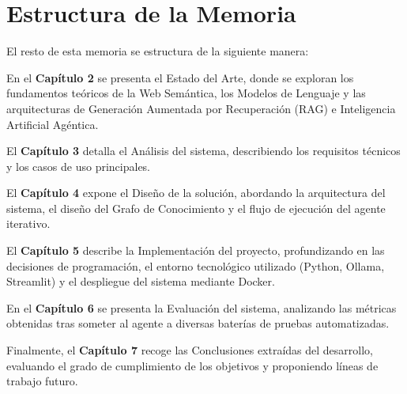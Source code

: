 \section{Estructura de la Memoria}

El resto de esta memoria se estructura de la siguiente manera:

En el \textbf{Capítulo 2} se presenta el Estado del Arte, donde se exploran los fundamentos teóricos de la Web Semántica, los Modelos de Lenguaje y las arquitecturas de Generación Aumentada por Recuperación (RAG) e Inteligencia Artificial Agéntica. 

El \textbf{Capítulo 3} detalla el Análisis del sistema, describiendo los requisitos técnicos y los casos de uso principales.

El \textbf{Capítulo 4} expone el Diseño de la solución, abordando la arquitectura del sistema, el diseño del Grafo de Conocimiento y el flujo de ejecución del agente iterativo.

El \textbf{Capítulo 5} describe la Implementación del proyecto, profundizando en las decisiones de programación, el entorno tecnológico utilizado (Python, Ollama, Streamlit) y el despliegue del sistema mediante Docker.

En el \textbf{Capítulo 6} se presenta la Evaluación del sistema, analizando las métricas obtenidas tras someter al agente a diversas baterías de pruebas automatizadas.

Finalmente, el \textbf{Capítulo 7} recoge las Conclusiones extraídas del desarrollo, evaluando el grado de cumplimiento de los objetivos y proponiendo líneas de trabajo futuro.